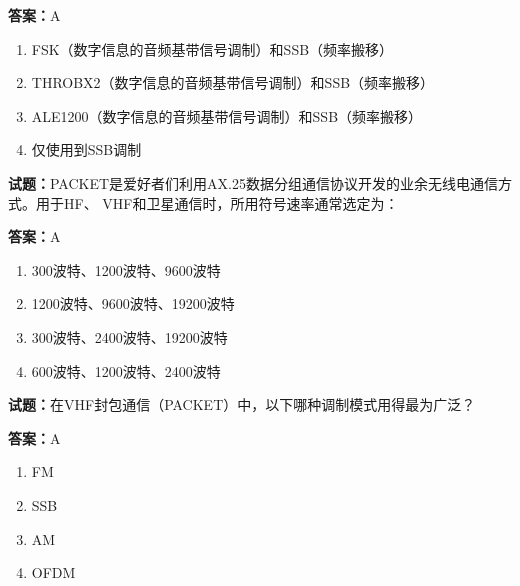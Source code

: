 \documentclass{ctexbook}
\begin{document}
\textbf{答案：}A 

\begin{enumerate}[leftmargin=3em]
  \item FSK（数字信息的音频基带信号调制）和SSB（频率搬移） 

  \item THROBX2（数字信息的音频基带信号调制）和SSB（频率搬移） 

  \item ALE1200（数字信息的音频基带信号调制）和SSB（频率搬移） 

  \item 仅使用到SSB调制 

\end{enumerate}






\vspace{1em}

\textbf{试题：}PACKET是爱好者们利用AX.25数据分组通信协议开发的业余无线电通信方式。用于HF、
VHF和卫星通信时，所用符号速率通常选定为： 

\textbf{答案：}A 

\begin{enumerate}[leftmargin=3em]
  \item 300波特、1200波特、9600波特 

  \item 1200波特、9600波特、19200波特 

  \item 300波特、2400波特、19200波特 

  \item 600波特、1200波特、2400波特 

\end{enumerate}





\vspace{1em}

\textbf{试题：}在VHF封包通信（PACKET）中，以下哪种调制模式用得最为广泛？ 

\textbf{答案：}A 

\begin{enumerate}[leftmargin=3em]
  \item FM 

  \item SSB 

  \item AM 

  \item OFDM 

\end{enumerate}
\end{document}
